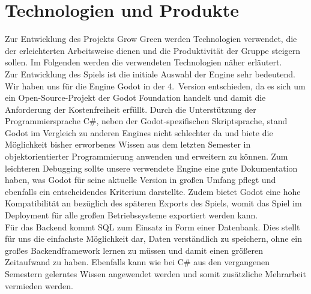 \chapter{Technologien und Produkte}\label{ch:technologien}
Zur Entwicklung des Projekts Grow Green werden Technologien verwendet, die der erleichterten Arbeitsweise dienen
und die Produktivität der Gruppe steigern sollen. 
Im Folgenden werden die verwendeten Technologien näher erläutert. \\
\newline
Zur Entwicklung des Spiels ist die initiale Auswahl der Engine sehr bedeutend. 
Wir haben uns für die Engine Godot in der 4.\ Version entschieden, da es sich um ein Open-Source-Projekt der Godot 
Foundation handelt und damit die Anforderung der Kostenfreiheit erfüllt.
Durch die Unterstützung der Programmiersprache C\#, neben der Godot-spezifischen Skriptsprache, stand Godot im Vergleich
zu anderen Engines nicht schlechter da und biete die Möglichkeit bisher erworbenes Wissen aus dem letzten Semester in 
objektorientierter Programmierung anwenden und erweitern zu können.
Zum leichteren Debugging sollte unsere verwendete Engine eine gute Dokumentation haben, was Godot für seine aktuelle 
Version in großen Umfang pflegt und ebenfalls ein entscheidendes Kriterium darstellte.
Zudem bietet Godot eine hohe Kompatibilität an bezüglich des späteren Exports des Spiels, womit das Spiel im 
Deployment für alle großen Betriebssysteme exportiert werden kann. \\
\newline
Für das Backend kommt SQL zum Einsatz in Form einer Datenbank.
Dies stellt für uns die einfachste Möglichkeit dar, Daten verständlich zu speichern, ohne ein großes Backendframework
lernen zu müssen und damit einen größeren Zeitaufwand zu haben. 
Ebenfalls kann wie bei C\# aus den vergangenen Semestern gelerntes Wissen angewendet werden und somit zusätzliche 
Mehrarbeit vermieden werden.
